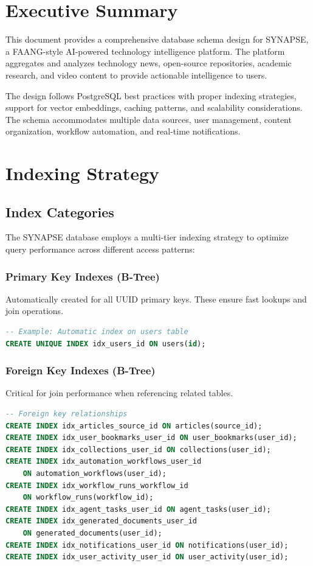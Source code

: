 \documentclass[12pt,a4paper]{report}
\begin{document}
\chapter{Executive Summary}

This document provides a comprehensive database schema design for SYNAPSE, a FAANG-style AI-powered technology intelligence platform. The platform aggregates and analyzes technology news, open-source repositories, academic research, and video content to provide actionable intelligence to users.

The design follows PostgreSQL best practices with proper indexing strategies, support for vector embeddings, caching patterns, and scalability considerations. The schema accommodates multiple data sources, user management, content organization, workflow automation, and real-time notifications.

\chapter{Indexing Strategy}

\section{Index Categories}

The SYNAPSE database employs a multi-tier indexing strategy to optimize query performance across different access patterns:

\subsection{Primary Key Indexes (B-Tree)}

Automatically created for all UUID primary keys. These ensure fast lookups and join operations.

\begin{lstlisting}[language=SQL,basicstyle=\ttfamily\small]
-- Example: Automatic index on users table
CREATE UNIQUE INDEX idx_users_id ON users(id);
\end{lstlisting}

\subsection{Foreign Key Indexes (B-Tree)}

Critical for join performance when referencing related tables.

\begin{lstlisting}[language=SQL,basicstyle=\ttfamily\small]
-- Foreign key relationships
CREATE INDEX idx_articles_source_id ON articles(source_id);
CREATE INDEX idx_user_bookmarks_user_id ON user_bookmarks(user_id);
CREATE INDEX idx_collections_user_id ON collections(user_id);
CREATE INDEX idx_automation_workflows_user_id 
    ON automation_workflows(user_id);
CREATE INDEX idx_workflow_runs_workflow_id 
    ON workflow_runs(workflow_id);
CREATE INDEX idx_agent_tasks_user_id ON agent_tasks(user_id);
CREATE INDEX idx_generated_documents_user_id 
    ON generated_documents(user_id);
CREATE INDEX idx_notifications_user_id ON notifications(user_id);
CREATE INDEX idx_user_activity_user_id ON user_activity(user_id);
\end{lstlisting}
\end{document}
